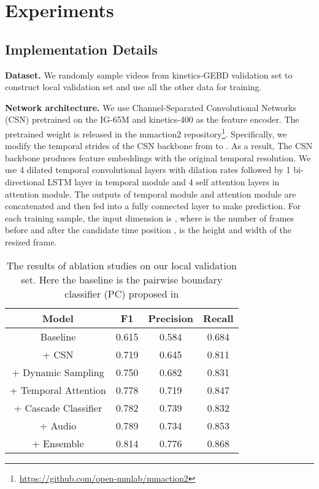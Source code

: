 \documentclass[final]{cvpr}
\begin{document}
\section{Experiments}

\subsection{Implementation Details}
\textbf{Dataset.} We randomly sample  videos from kinetics-GEBD validation set to construct local validation set and use all the other data for training. 

\textbf{Network architecture.} We use Channel-Separated Convolutional Networks (CSN) \cite{CSN} pretrained on the IG-65M \cite{IG} and kinetics-400 as the feature encoder. The pretrained weight is released in the mmaction2 repository\footnote{\url{https://github.com/open-mmlab/mmaction2}}. Specifically, we modify the temporal strides of the CSN backbone from  to . As a result, The CSN backbone produces feature embeddings with the original temporal resolution. We use 4 dilated temporal convolutional layers with dilation rates  followed by 1 bi-directional LSTM layer in temporal module and 4 self attention layers \cite{DBLP:conf/nips/attention} in attention module. The outputs of temporal module and attention module are concatenated and then fed into a fully connected layer to make prediction. For each training sample, the input dimension is , where  is the number of frames before and after the candidate time position ,  is the height and width of the resized frame. 


\begin{table}[!t]
    \centering
    \begin{tabular}{c c c c}
    \toprule[1.2pt]
        Model & F1 & Precision & Recall \\
    \hline
        Baseline\cite{DBLP:journals/corr/GEBD_dataset} & 0.615 & 0.584 & 0.684 \\
        + CSN \cite{CSN} & 0.719 & 0.645 & 0.811 \\
        + Dynamic Sampling & 0.750 & 0.682 & 0.831 \\
        + Temporal Attention & 0.778 & 0.719 & 0.847 \\
        + Cascade Classifier & 0.782 & 0.739 & 0.832 \\
        + Audio & 0.789 & 0.734 & 0.853 \\
        + Ensemble & 0.814 & 0.776 & 0.868 \\
    \bottomrule[1.2pt]
    \end{tabular}
    \caption{The results of ablation studies on our local validation set. Here the baseline is the pairwise boundary classifier (PC) proposed in \cite{DBLP:journals/corr/GEBD_dataset}}
    \label{tab:ablation}
\end{table}
\end{document}
